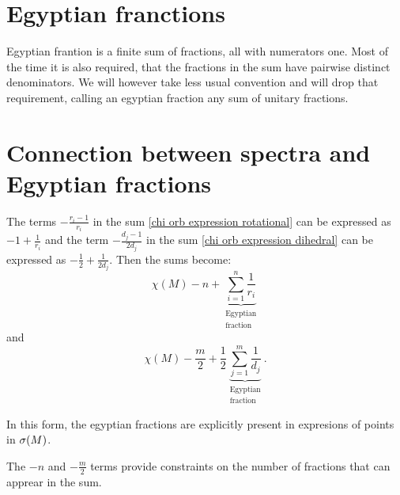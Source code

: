 
\section{Egyptian franctions}
Egyptian frantion is a finite sum of fractions, all with numerators one. 
Most of the time it is also required, that the fractions in the sum have pairwise distinct 
denominators. We will however take less usual convention and will drop that requirement, 
calling an egyptian fraction any sum of unitary fractions. 
\section{Connection between spectra and Egyptian fractions}\label{Egyptian_fractions}
The terms $-\frac{r_i-1}{r_i}$ in the sum \ref{chi orb expression rotational} 
can be expressed as $-1+ \frac{1}{r_i}$ 
and the term $-\frac{d_j-1}{2d_j}$ in the sum \ref{chi orb expression dihedral} can be expressed as 
$-\frac{1}{2} + \frac{1}{2d_j}$. 
Then the sums become:
\begin{equation}\label{Egyptian S2 sum}
\chi(M) - n + \underbrace{\sum_{i=1}^n \frac{1}{r_i}}_{
\substack{\textrm{Egyptian} \\ \textrm{fraction}}}
\end{equation}
and
\begin{equation}\label{Egyptian D2 sum}
\chi(M) - \frac{m}{2} + \frac{1}{2}
\underbrace{\sum_{j=1}^m \frac{1}{d_j}}_{
\substack{\textrm{Egyptian} \\\textrm{fraction}}}.
\end{equation}

In this form, the egyptian fractions are explicitly present in expresions of 
points in ${{\sigma}(M)}$.

The $-n$ and $-\frac{m}{2}$ terms provide constraints on the number of fractions that 
can apprear in the sum.

